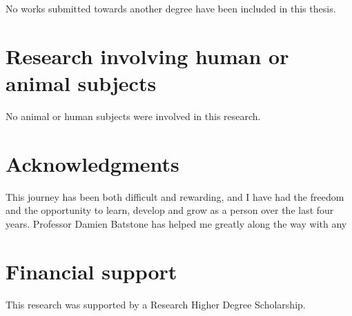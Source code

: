 No works submitted towards another degree have been included in this thesis.

\section*{Research involving human or animal subjects}

No animal or human subjects were involved in this research.

\clearpage

\section*{Acknowledgments}
This journey has been both difficult and rewarding, and I have had the freedom and the opportunity to learn, develop and grow as a person over the last four years. Professor Damien Batstone has helped me greatly along the way with any 


\clearpage

\section*{Financial support}



This research was supported by a Research Higher Degree Scholarship.


